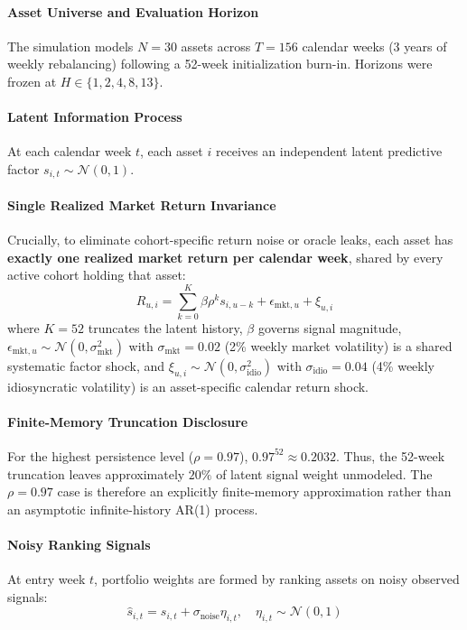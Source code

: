\documentclass[11pt,a4paper]{article}
\theoremstyle{definition}
\begin{document}
\paragraph{Asset Universe and Evaluation Horizon}
The simulation models $N = 30$ assets across $T = 156$ calendar weeks (3 years of weekly rebalancing) following a 52-week initialization burn-in. Horizons were frozen at $H \in \{1, 2, 4, 8, 13\}$.

\paragraph{Latent Information Process}
At each calendar week $t$, each asset $i$ receives an independent latent predictive factor $s_{i,t} \sim \mathcal{N}(0, 1)$.

\paragraph{Single Realized Market Return Invariance}
Crucially, to eliminate cohort-specific return noise or oracle leaks, each asset has \textbf{exactly one realized market return per calendar week}, shared by every active cohort holding that asset:
\begin{equation}
R_{u, i} = \sum_{k=0}^{K} \beta \rho^k s_{i, u-k} + \epsilon_{\text{mkt}, u} + \xi_{u, i}
\label{eq:dgp_return}
\end{equation}
where $K = 52$ truncates the latent history, $\beta$ governs signal magnitude, $\epsilon_{\text{mkt}, u} \sim \mathcal{N}(0, \sigma_{\text{mkt}}^2)$ with $\sigma_{\text{mkt}} = 0.02$ (2\% weekly market volatility) is a shared systematic factor shock, and $\xi_{u, i} \sim \mathcal{N}(0, \sigma_{\text{idio}}^2)$ with $\sigma_{\text{idio}} = 0.04$ (4\% weekly idiosyncratic volatility) is an asset-specific calendar return shock.

\paragraph{Finite-Memory Truncation Disclosure}
For the highest persistence level ($\rho = 0.97$), $0.97^{52} \approx 0.2032$. Thus, the 52-week truncation leaves approximately $20\%$ of latent signal weight unmodeled. The $\rho = 0.97$ case is therefore an explicitly finite-memory approximation rather than an asymptotic infinite-history AR(1) process.

\paragraph{Noisy Ranking Signals}
At entry week $t$, portfolio weights are formed by ranking assets on noisy observed signals:
\begin{equation}
\hat{s}_{i,t} = s_{i,t} + \sigma_{\text{noise}} \eta_{i,t}, \quad \eta_{i,t} \sim \mathcal{N}(0, 1)
\end{equation}
\end{document}
